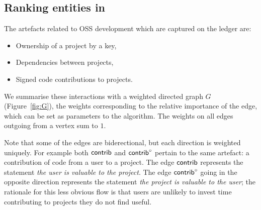 \subsection{Ranking entities in \oscoin{}}
\label{s:netgraph}

The artefacts related to OSS development which are captured on the \oscoin{}
ledger are:
\begin{itemize}
  \item Ownership of a project by a key,
  \item Dependencies between projects,
  \item Signed code contributions to projects.
\end{itemize}

We summarise these interactions with a weighted directed graph $G$
(Figure~\ref{fig:G}), the weights corresponding to the relative importance of
the edge, which can be set as parameters to the algorithm.  The weights on all
edges outgoing from a vertex sum to $1$.

\bigskip

\begin{center}
\end{center}
\medskip


Note that some of the edges are biderectional, but each direction is
weighted uniquely. For example both $\mathsf{contrib}$ and $\mathsf{contrib}^\circ$ pertain to
the same artefact: a contribution of code from a user to a
project. The edge $\mathsf{contrib}$ represents the statement \emph{the user
  is valuable to the project}. The edge $\mathsf{contrib}^\circ$ going in the
opposite direction represents the statement \emph{the project is
  valuable to the user}; the rationale for this less obvious flow is
that users are unlikely to invest time contributing to projects they
do not find useful.

